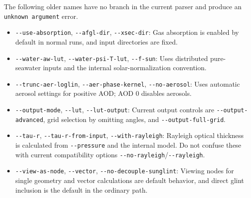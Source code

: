 The following older names have no branch in the current parser and produce an \texttt{unknown argument\allowbreak{}} error.

\begin{itemize}
\item \texttt{-\allowbreak{}-\allowbreak{}use-\allowbreak{}absorption}, \texttt{-\allowbreak{}-\allowbreak{}afgl-\allowbreak{}dir}, \texttt{-\allowbreak{}-\allowbreak{}xsec-\allowbreak{}dir}: Gas absorption is enabled by default in normal runs, and input directories are fixed.
\item \texttt{-\allowbreak{}-\allowbreak{}water-\allowbreak{}aw-\allowbreak{}lut}, \texttt{-\allowbreak{}-\allowbreak{}water-\allowbreak{}psi-\allowbreak{}T-\allowbreak{}lut}, \texttt{-\allowbreak{}-\allowbreak{}f-\allowbreak{}sun}: Uses distributed pure-seawater inputs and the internal solar-normalization convention.
\item \texttt{-\allowbreak{}-\allowbreak{}trunc-\allowbreak{}aer-\allowbreak{}loglin}, \texttt{-\allowbreak{}-\allowbreak{}aer-\allowbreak{}phase-\allowbreak{}kernel}, \texttt{-\allowbreak{}-\allowbreak{}no-\allowbreak{}aerosol}: Uses automatic aerosol settings for positive AOD; AOD 0 disables aerosols.
\item \texttt{-\allowbreak{}-\allowbreak{}output-\allowbreak{}mode}, \texttt{-\allowbreak{}-\allowbreak{}lut}, \texttt{-\allowbreak{}-\allowbreak{}lut-\allowbreak{}output}: Current output controls are \texttt{-\allowbreak{}-\allowbreak{}output-\allowbreak{}advanced}, grid selection by omitting angles, and \texttt{-\allowbreak{}-\allowbreak{}output-\allowbreak{}full-\allowbreak{}grid}.
\item \texttt{-\allowbreak{}-\allowbreak{}tau-\allowbreak{}r}, \texttt{-\allowbreak{}-\allowbreak{}tau-\allowbreak{}r-\allowbreak{}from-\allowbreak{}input}, \texttt{-\allowbreak{}-\allowbreak{}with-\allowbreak{}rayleigh}: Rayleigh optical thickness is calculated from \texttt{-\allowbreak{}-\allowbreak{}pressure} and the internal model. Do not confuse these with current compatibility options \texttt{-\allowbreak{}-\allowbreak{}no-\allowbreak{}rayleigh}/\texttt{-\allowbreak{}-\allowbreak{}rayleigh}.
\item \texttt{-\allowbreak{}-\allowbreak{}view-\allowbreak{}as-\allowbreak{}node}, \texttt{-\allowbreak{}-\allowbreak{}vector}, \texttt{-\allowbreak{}-\allowbreak{}no-\allowbreak{}decouple-\allowbreak{}sunglint}: Viewing nodes for single geometry and vector calculations are default behavior, and direct glint inclusion is the default in the ordinary path.
\end{itemize}

